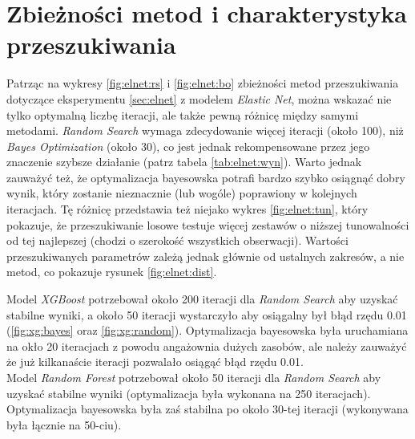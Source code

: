 \documentclass[a4paper,11pt]{article}
\begin{document}
\section{Zbieżności metod i charakterystyka przeszukiwania}
\label{sec:bias}
Patrząc na wykresy \ref{fig:elnet:rs} i \ref{fig:elnet:bo} zbieżności metod przeszukiwania dotyczące eksperymentu \ref{sec:elnet} z modelem \textit{Elastic Net}, można wskazać nie tylko optymalną liczbę iteracji, ale także pewną różnicę między samymi metodami. \textit{Random Search} wymaga zdecydowanie więcej iteracji (około 100), niż \textit{Bayes Optimization} (około 30), co jest jednak rekompensowane przez jego znaczenie szybsze działanie (patrz tabela \ref{tab:elnet:wyn}). Warto jednak zauważyć też, że optymalizacja bayesowska potrafi bardzo szybko osiągnąć dobry wynik, który zostanie nieznacznie (lub wogóle) poprawiony w kolejnych iteracjach. Tę różnicę przedstawia też niejako wykres \ref{fig:elnet:tun}, który pokazuje, że przeszukiwanie losowe testuje więcej zestawów o niższej tunowalności od tej najlepszej (chodzi o szerokość wszystkich obserwacji). Wartości przeszukiwanych parametrów zależą jednak głównie od ustalnych zakresów, a nie metod, co pokazuje rysunek \ref{fig:elnet:dist}. 

 Model \textit{XGBoost} potrzebował około 200 iteracji dla \textit{Random Search} aby uzyskać stabilne wyniki, a około 50 iteracji wystarczyło aby osiągalny był błąd rzędu 0.01 (\ref{fig:xg:bayes} oraz \ref{fig:xg:random}). Optymalizacja bayesowska była uruchamiana na okło 20 iteracjach z powodu angażownia dużych zasobów, ale należy zauważyć że już kilkanaście iteracji pozwalało osiągąć błąd rzędu 0.01.\\

Model \textit{Random Forest} potrzebował około 50 iteracji dla \textit{Random Search} aby uzyskać stabilne wyniki (optymalizacja była wykonana na 250 iteracjach). Optymalizacja bayesowska była zaś stabilna po około 30-tej iteracji (wykonywana była łącznie na 50-ciu).

\newpage
\end{document}
